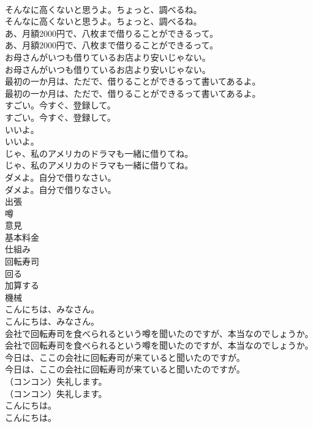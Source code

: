 \documentclass[8pt]{extreport}
\begin{document}
\begin{CJK}{UTF8}{min}
\\	そんなに高くないと思うよ。ちょっと、調べるね。	
\\	そんなに高くないと思うよ。ちょっと、調べるね。 
\\	あ、月額2000円で、八枚まで借りることができるって。	
\\	あ、月額2000円で、八枚まで借りることができるって。 
\\	お母さんがいつも借りているお店より安いじゃない。	
\\	お母さんがいつも借りているお店より安いじゃない。 
\\	最初の一か月は、ただで、借りることができるって書いてあるよ。	
\\	最初の一か月は、ただで、借りることができるって書いてあるよ。 
\\	すごい。今すぐ、登録して。	
\\	すごい。今すぐ、登録して。 
\\	いいよ。	
\\	いいよ。 
\\	じゃ、私のアメリカのドラマも一緒に借りてね。	
\\	じゃ、私のアメリカのドラマも一緒に借りてね。 
\\	ダメよ。自分で借りなさい。	
\\	ダメよ。自分で借りなさい。 
\\	出張
\\	噂
\\	意見
\\	基本料金
\\	仕組み
\\	回転寿司
\\	回る
\\	加算する
\\	機械
\\	こんにちは、みなさん。	
\\	こんにちは、みなさん。 
\\	会社で回転寿司を食べられるという噂を聞いたのですが、本当なのでしょうか。	
\\	会社で回転寿司を食べられるという噂を聞いたのですが、本当なのでしょうか。 
\\	今日は、ここの会社に回転寿司が来ていると聞いたのですが。	
\\	今日は、ここの会社に回転寿司が来ていると聞いたのですが。 
\\	（コンコン）失礼します。	
\\	（コンコン）失礼します。 
\\	こんにちは。	
\\	こんにちは。 

\end{CJK}
\end{document}
